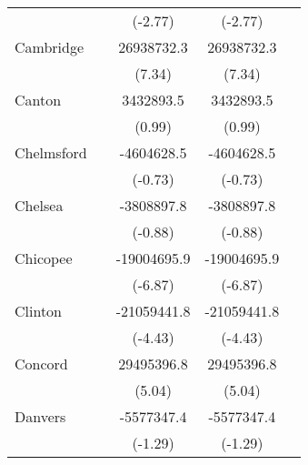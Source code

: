 {\begin{tabular}{l*{4}{c}}
                    &                     &     (-2.77)         &     (-2.77)         &                     \\
\addlinespace
Cambridge           &                     &  26938732.3\sym{***}&  26938732.3\sym{***}&                     \\
                    &                     &      (7.34)         &      (7.34)         &                     \\
\addlinespace
Canton              &                     &   3432893.5         &   3432893.5         &                     \\
                    &                     &      (0.99)         &      (0.99)         &                     \\
\addlinespace
Chelmsford          &                     &  -4604628.5         &  -4604628.5         &                     \\
                    &                     &     (-0.73)         &     (-0.73)         &                     \\
\addlinespace
Chelsea             &                     &  -3808897.8         &  -3808897.8         &                     \\
                    &                     &     (-0.88)         &     (-0.88)         &                     \\
\addlinespace
Chicopee            &                     & -19004695.9\sym{***}& -19004695.9\sym{***}&                     \\
                    &                     &     (-6.87)         &     (-6.87)         &                     \\
\addlinespace
Clinton             &                     & -21059441.8\sym{***}& -21059441.8\sym{***}&                     \\
                    &                     &     (-4.43)         &     (-4.43)         &                     \\
\addlinespace
Concord             &                     &  29495396.8\sym{***}&  29495396.8\sym{***}&                     \\
                    &                     &      (5.04)         &      (5.04)         &                     \\
\addlinespace
Danvers             &                     &  -5577347.4         &  -5577347.4         &                     \\
                    &                     &     (-1.29)         &     (-1.29)         &                     \\

\end{tabular}}
